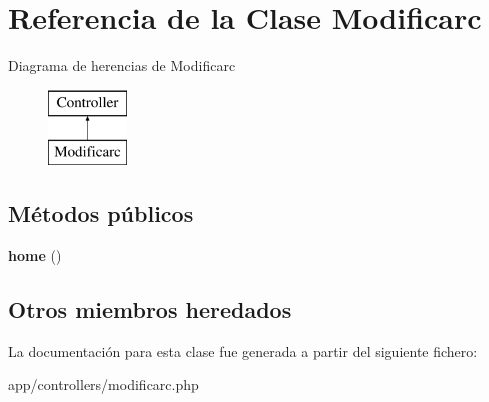 \hypertarget{class_modificarc}{}\section{Referencia de la Clase Modificarc}
\label{class_modificarc}
Diagrama de herencias de Modificarc\begin{figure}[H]
\begin{center}
\leavevmode
\includegraphics[height=2.000000cm]{class_modificarc}
\end{center}
\end{figure}
\subsection*{Métodos públicos}
\begin{DoxyCompactItemize}
\item 
\hypertarget{class_modificarc_a174b8e4c7d4d7363c6f773671defdeff}{}{\bfseries home} ()\label{class_modificarc_a174b8e4c7d4d7363c6f773671defdeff}

\end{DoxyCompactItemize}
\subsection*{Otros miembros heredados}


La documentación para esta clase fue generada a partir del siguiente fichero\+:\begin{DoxyCompactItemize}
\item 
app/controllers/modificarc.\+php\end{DoxyCompactItemize}
